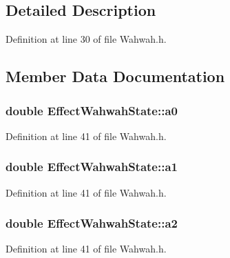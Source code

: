 \subsection{Detailed Description}


Definition at line 30 of file Wahwah.\+h.



\subsection{Member Data Documentation}
\subsubsection[{\texorpdfstring{a0}{a0}}]{\setlength{\rightskip}{0pt plus 5cm}double Effect\+Wahwah\+State\+::a0}\hypertarget{class_effect_wahwah_state_a5dccfe5ba10622327dfddfc2640a95c7}{}\label{class_effect_wahwah_state_a5dccfe5ba10622327dfddfc2640a95c7}


Definition at line 41 of file Wahwah.\+h.

\subsubsection[{\texorpdfstring{a1}{a1}}]{\setlength{\rightskip}{0pt plus 5cm}double Effect\+Wahwah\+State\+::a1}\hypertarget{class_effect_wahwah_state_a09e52dce2462501cf72cb1c10fa7c11d}{}\label{class_effect_wahwah_state_a09e52dce2462501cf72cb1c10fa7c11d}


Definition at line 41 of file Wahwah.\+h.

\subsubsection[{\texorpdfstring{a2}{a2}}]{\setlength{\rightskip}{0pt plus 5cm}double Effect\+Wahwah\+State\+::a2}\hypertarget{class_effect_wahwah_state_a51b7d95c0c611b72df5610229ce6c5bf}{}\label{class_effect_wahwah_state_a51b7d95c0c611b72df5610229ce6c5bf}


Definition at line 41 of file Wahwah.\+h.

